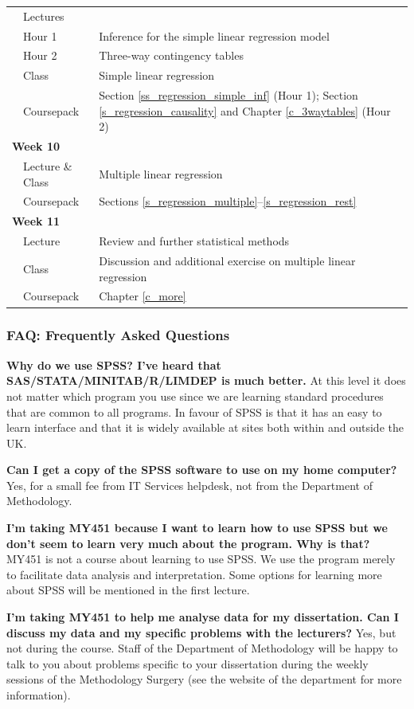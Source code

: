 \begin{tabular}{lll}
& Lectures  & \\
& Hour 1  &
Inference for the simple linear regression model \\
& Hour 2  &
Three-way contingency tables \\
& Class & Simple linear regression \\
& Coursepack & Section \ref{ss_regression_simple_inf}
(Hour 1); Section \ref{s_regression_causality} and
Chapter \ref{c_3waytables} (Hour 2) \\
\multicolumn{2}{l}{\textbf{Week 10}} & \\
& Lecture \& Class & Multiple linear regression \\
& Coursepack & Sections \ref{s_regression_multiple}--\ref{s_regression_rest}
\\
\multicolumn{2}{l}{\textbf{Week 11}} & \\
& Lecture & Review and further statistical methods\\
& Class & Discussion and additional exercise on multiple linear regression \\
& Coursepack & Chapter \ref{c_more}
\end{tabular}

\newpage
\subsubsection{FAQ: Frequently Asked Questions}

\textbf{Why do we use SPSS? I've heard that SAS/STATA/MINITAB/R/LIMDEP is
much better.} At this level it does not matter which program you use since
we are learning standard procedures that are common to all programs. In
favour of SPSS is that it has an easy to learn interface and
that it is widely available at sites both within and outside the UK.

\textbf{Can I get a copy of the SPSS software to use on my home computer?}
Yes,
for a small fee from IT Services helpdesk, not from the Department of Methodology.

\textbf{I'm taking MY451 because I want to learn how to use SPSS but we don't
seem to learn very much about the program. Why is that?} MY451 is not a
course about learning to use SPSS. We use the program merely to
facilitate data analysis and interpretation.
Some options for learning  more
about SPSS will be mentioned in the first lecture.

\textbf{I'm taking MY451 to help me analyse data for my dissertation. Can I
discuss my data and my specific problems with the lecturers?} Yes, but
not during the course.
Staff of the Department of Methodology
will be happy to talk to you about
problems specific to your dissertation during the weekly sessions of the
Methodology Surgery (see the website of the department for more information).


